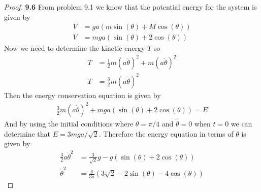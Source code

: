 \documentclass[11pt]{article}
\theoremstyle{definition}
\begin{document}
\cleardoublepage
	\begin{proof}{\textbf{9.6}}
        From problem 9.1 we know that the potential energy for the system is
        given by
        \begin{align*}
            V &= ga\left(m\sin(\theta) + M\cos(\theta)\right)\\
            V &= mga\left(\sin(\theta) + 2\cos(\theta)\right)
        \end{align*}
        Now we need to determine the kinetic energy $T$ so
        \begin{align*}
            T &= \frac{1}{2}m(a\dot{\theta})^{2} + m(a\dot{\theta})^{2}\\
            T &= \frac{3}{2}m(a\dot\theta)^2
        \end{align*}
        Then the energy conservation equation is given by
        \begin{align*}
            \frac{3}{2}m(a\dot\theta)^2 + 
            mga\left(\sin(\theta) + 2\cos(\theta)\right) = E
        \end{align*}
        And by using the initial conditions where $\theta=\pi/4$ and
        $\dot\theta = 0$ when $t=0$ we can determine that $E = 3mga/\sqrt{2}$.
        Therefore the energy equation in terms of $\theta$ is given by
        \begin{align*}
            \frac{3}{2}a\dot\theta^2 &= \frac{3}{\sqrt{2}}g - g\left(\sin(\theta) + 2\cos(\theta)\right)\\
            \dot\theta^2 &= \frac{g}{3a}\left(3\sqrt{2} - 2\sin(\theta) -
            4\cos(\theta)\right)
        \end{align*}


\end{proof}
\end{document}
